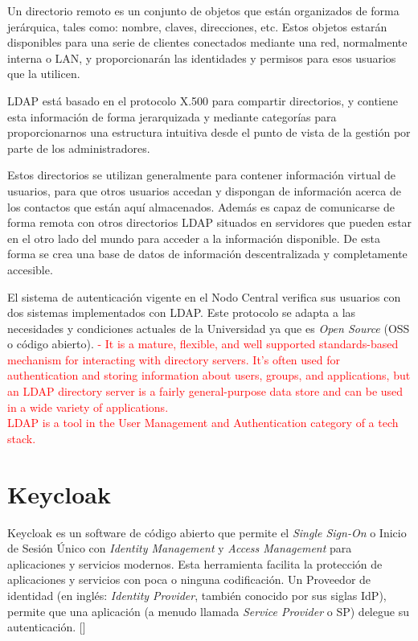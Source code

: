 Un directorio remoto es un conjunto de objetos que están organizados de forma jerárquica, tales como: nombre, claves, direcciones, etc. Estos objetos estarán disponibles para una serie de clientes conectados mediante una red, normalmente interna o LAN, y proporcionarán las identidades y permisos para esos usuarios que la utilicen.

LDAP está basado en el protocolo X.500 para compartir directorios, y contiene esta información de forma jerarquizada y mediante categorías para proporcionarnos una estructura intuitiva desde el punto de vista de la gestión por parte de los administradores.

Estos directorios se utilizan generalmente para contener información virtual de usuarios, para que otros usuarios accedan y dispongan de información acerca de los contactos que están aquí almacenados. Además es capaz de comunicarse de forma remota con otros directorios LDAP situados en servidores que pueden estar en el otro lado del mundo para acceder a la información disponible. De esta forma se crea una base de datos de información descentralizada y completamente accesible.
 
El sistema de autenticación vigente en el Nodo Central verifica sus usuarios con dos sistemas implementados con LDAP. Este protocolo se adapta a las necesidades y condiciones actuales de la Universidad ya que es \textit{Open Source} (OSS o código abierto).
\textcolor{red}{
	- It is a mature, flexible, and well supported standards-based mechanism for interacting with directory servers. It’s often used for authentication and storing information about users, groups, and applications, but an LDAP directory server is a fairly general-purpose data store and can be used in a wide variety of applications. \\ LDAP is a tool in the User Management and Authentication category of a tech stack.}


\section{Keycloak}
Keycloak es un software de código abierto que permite el \textit{Single Sign-On} o Inicio de Sesión Único con \textit{Identity Management} y \textit{Access Management} para aplicaciones y servicios modernos. Esta herramienta facilita la protección de aplicaciones y servicios con poca o ninguna codificación. Un Proveedor de identidad (en inglés: \textit{Identity Provider}, también conocido por sus siglas IdP), permite que una aplicación (a menudo llamada \textit{Service Provider} o SP) delegue su autenticación. [\cite{KeycloakDoc}]

